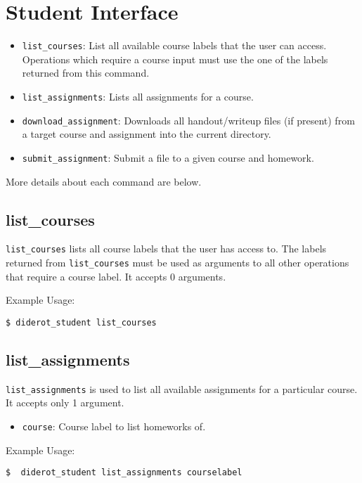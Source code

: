 \section{Student Interface}

\begin{itemize}
  \item \verb|list_courses|: List all available course labels that the user can access.
    Operations which require a course input must use the one of the labels returned from this command.
  \item \verb|list_assignments|: Lists all assignments for a course.
  \item \verb|download_assignment|: Downloads all handout/writeup files (if present) from a
    target course and assignment into the current directory.
  \item \verb|submit_assignment|: Submit a file to a given course and homework.
\end{itemize}

More details about each command are below.

\subsection{list\_courses}

\verb|list_courses| lists all course labels that the user has access to.
%
The labels returned from \verb|list_courses| must be used as arguments to all other
operations that require a course label.
%
It accepts 0 arguments.

Example Usage:
\begin{verbatim}
$ diderot_student list_courses
\end{verbatim}

\subsection{list\_assignments}

\verb|list_assignments| is used to list all available assignments for a particular course.
%
It accepts only 1 argument.
\begin{itemize}
  \item \verb|course|: Course label to list homeworks of.
\end{itemize}

Example Usage:
\begin{verbatim}
$  diderot_student list_assignments courselabel
\end{verbatim}

